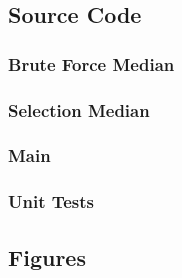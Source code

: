 \documentclass{article}
\begin{document}
    \subsection{Source Code}
        \subsubsection{Brute Force Median}
            

        \subsubsection{Selection Median}
            

        \subsubsection{Main}
            

        \subsubsection{Unit Tests}
            
        \newpage


    \subsection{Figures}
\end{document}
